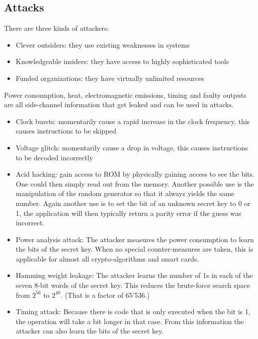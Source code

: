 \subsection{Attacks}
\begin{mytitle} There are three kinds of attackers:
\begin{itemize}
    \item Clever outsiders: they use existing weaknesses in systems
    \item Knowledgeable insiders: they have access to highly sophisticated tools
    \item Funded organizations: they have virtually unlimited resources
\end{itemize}
\end{mytitle}
\begin{mytitle}[Leakage] Power consumption, heat, electromagnetic emissions, timing and faulty outputs are all side-channel information that get leaked and can be used in attacks.
\end{mytitle}
\begin{mytitle}\hfill
\begin{itemize}
    \item Clock bursts: momentarily cause a rapid increase in the clock frequency, this causes instructions to be skipped
    \item Voltage glitch: momentarily cause a drop in voltage, this causes instructions to be decoded incorrectly
    \item Acid hacking: gain access to ROM by physically gaining access to see the bits. One could then simply read out from the memory. Another possible use is the  manipulation of the random generator so that it always yields the same number. Again another use is to set the bit of an unknown secret key to 0 or 1, the application will then typically return a parity error if the guess was incorrect. 
\end{itemize}
\end{mytitle}
\begin{mytitle}\hfill
\begin{itemize}
    \item Power analysis attack: The attacker measures the power consumption to learn the bits of the secret key. When no special counter-measures are taken, this is applicable for almost all crypto-algorithms and smart cards.
    \item Hamming weight leakage: The attacker learns the number of 1s in each of the seven 8-bit words of the secret key. This reduces the brute-force search space from $2^{56}$ to $2^{40}$. (That is a factor of 65'536.)
    \item Timing attack: Because there is code that is only executed when the bit is 1, the operation will take a bit longer in that case. From this information the attacker can also learn the bits of the secret key.
\end{itemize}
\end{mytitle}

